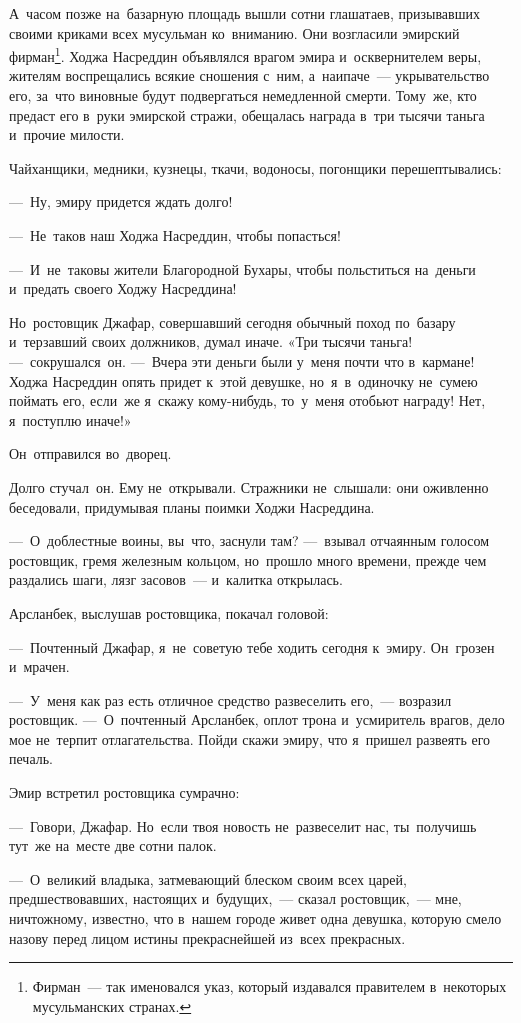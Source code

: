 \documentclass[12pt,a4paper]{book}
\begin{document}
А~часом позже на~базарную площадь вышли сотни глашатаев, призывавших своими криками всех мусульман ко~вниманию. Они возгласили эмирский фирман\footnote{Фирман~— так именовался указ, который издавался правителем в~некоторых мусульманских странах.}. Ходжа Насреддин объявлялся врагом эмира и~осквернителем веры, жителям воспрещались всякие сношения с~ним, а~наипаче~— укрывательство его, за~что виновные будут подвергаться немедленной смерти. Тому~же, кто предаст его в~руки эмирской стражи, обещалась награда в~три тысячи таньга и~прочие милости.

Чайханщики, медники, кузнецы, ткачи, водоносы, погонщики перешептывались:

—~Ну, эмиру придется ждать долго!

—~Не~таков наш Ходжа Насреддин, чтобы попасться!

—~И~не~таковы жители Благородной Бухары, чтобы польститься на~деньги и~предать своего Ходжу Насреддина!

Но~ростовщик Джафар, совершавший сегодня обычный поход по~базару и~терзавший своих должников, думал иначе. «Три тысячи таньга! —~сокрушался~он. —~Вчера эти деньги были у~меня почти что в~кармане! Ходжа Насреддин опять придет к~этой девушке, но~я~в~одиночку не~сумею поймать его, если~же я~скажу кому-нибудь, то~у~меня отобьют награду! Нет, я~поступлю иначе!»

Он~отправился во~дворец.

Долго стучал~он. Ему не~открывали. Стражники не~слышали: они оживленно беседовали, придумывая планы поимки Ходжи Насреддина.

—~О~доблестные воины, вы~что, заснули там? —~взывал отчаянным голосом ростовщик, гремя железным кольцом, но~прошло много времени, прежде чем раздались шаги, лязг засовов~— и~калитка открылась.

Арсланбек, выслушав ростовщика, покачал головой:

—~Почтенный Джафар, я~не~советую тебе ходить сегодня к~эмиру. Он~грозен и~мрачен.

—~У~меня как раз есть отличное средство развеселить его,~— возразил ростовщик. —~О~почтенный Арсланбек, оплот трона и~усмиритель врагов, дело мое не~терпит отлагательства. Пойди скажи эмиру, что я~пришел развеять его печаль.

Эмир встретил ростовщика сумрачно:

—~Говори, Джафар. Но~если твоя новость не~развеселит нас, ты~получишь тут~же на~месте две сотни палок.

—~О~великий владыка, затмевающий блеском своим всех царей, предшествовавших, настоящих и~будущих,~— сказал ростовщик,~— мне, ничтожному, известно, что в~нашем городе живет одна девушка, которую смело назову перед лицом истины прекраснейшей из~всех прекрасных.
\end{document}

